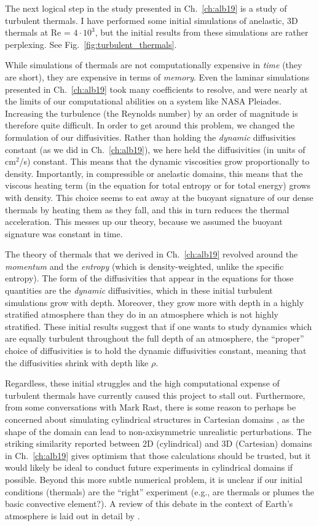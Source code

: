 The next logical step in the study presented in Ch.~\ref{ch:alb19} is a study of turbulent thermals.
I have performed some initial simulations of anelastic, 3D thermals at Re = $4 \cdot 10^3$, but the initial results from these simulations are rather perplexing.
See Fig.~\ref{fig:turbulent_thermals}.

While simulations of thermals are not computationally expensive in \emph{time} (they are short), they are expensive in terms of \emph{memory}.
Even the laminar simulations presented in Ch.~\ref{ch:alb19} took many coefficients to resolve, and were nearly at the limits of our computational abilities on a system like NASA Pleiades.
Increasing the turbulence (the Reynolds number) by an order of magnitude is therefore quite difficult.
In order to get around this problem, we changed the formulation of our diffusivities.
Rather than holding the \emph{dynamic} diffusivities constant (as we did in Ch.~\ref{ch:alb19}), we here held the diffusivities (in units of cm$^2$/s) constant.
This means that the dynamic viscosities grow proportionally to density.
Importantly, in compressible or anelastic domains, this means that the viscous heating term (in the equation for total entropy or for total energy) grows with density.
This choice seems to eat away at the buoyant signature of our dense thermals by heating them as they fall, and this in turn reduces the thermal acceleration.
This messes up our theory, because we assumed the buoyant signature was constant in time.

The theory of thermals that we derived in Ch.~\ref{ch:alb19} revolved around the \emph{momentum} and the \emph{entropy} (which is density-weighted, unlike the specific entropy).
The form of the diffusivities that appear in the equations for those quantities are the \emph{dynamic} diffusivities, which in these initial turbulent simulations grow with depth.
Moreover, they grow more with depth in a highly stratified atmosphere than they do in an atmosphere which is not highly stratified.
These initial results suggest that if one wants to study dynamics which are equally turbulent throughout the full depth of an atmosphere, the ``proper'' choice of diffusivities is to hold the dynamic diffusivities constant, meaning that the diffusivities shrink with depth like $\rho$.

Regardless, these initial struggles and the high computational expense of turbulent thermals have currently caused this project to stall out.
Furthermore, from some conversations with Mark Rast, there is some reason to perhaps be concerned about simulating cylindrical structures in Cartesian domains \citep[see e.g., Fig.~9 of][]{clyne&all2007}, as the shape of the domain can lead to non-axisymmetric unrealistic perturbations.
The striking similarity reported between 2D (cylindrical) and 3D (Cartesian) domains in Ch.~\ref{ch:alb19} gives optimism that those calculations should be trusted, but it would likely be ideal to conduct future experiments in cylindrical domains if possible.
Beyond this more subtle numerical problem, it is unclear if our initial conditions (thermals) are the ``right'' experiment (e.g., are thermals or plumes the basic convective element?).
A review of this debate in the context of Earth's atmosphere is laid out in detail by \citet{yano2014}.


